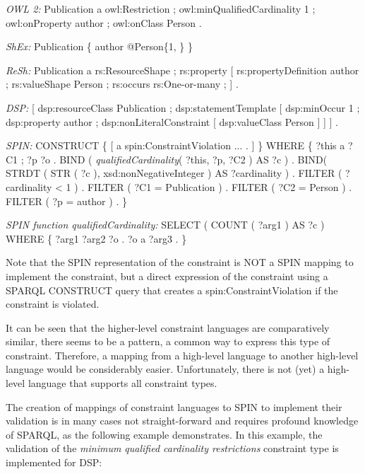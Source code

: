 \documentclass[a4paper,fontsize=11pt]{scrartcl}
\begin{document}
\begin{ex}[commandchars=\\\{\}]
\textit{OWL 2:} Publication a owl:Restriction ;
          owl:minQualifiedCardinality 1 ;
          owl:onProperty author ;
          owl:onClass Person .
		
\textit{ShEx:} Publication \{ author @Person\{1, \} \}

\textit{ReSh:} Publication a rs:ResourceShape ; rs:property [
          rs:propertyDefinition author ;
          rs:valueShape Person ;
          rs:occurs rs:One-or-many ; ] .
		
\textit{DSP:} [ dsp:resourceClass Publication ; dsp:statementTemplate [ 
          dsp:minOccur 1 ; 
          dsp:property author ; 
          dsp:nonLiteralConstraint [ dsp:valueClass Person ] ] ] .
					
\textit{SPIN:} CONSTRUCT \{ [ a spin:ConstraintViolation ... . ] \} WHERE \{ 
          ?this 
              a ?C1 ;
              ?p ?o .
          BIND ( \textit{qualifiedCardinality}( ?this, ?p, ?C2 ) AS ?c ) .
          BIND( STRDT ( STR ( ?c ), xsd:nonNegativeInteger ) AS ?cardinality ) .
          FILTER ( ?cardinality < 1 ) . 
          FILTER ( ?C1 = Publication ) .
          FILTER ( ?C2 = Person ) .
          FILTER ( ?p = author ) . \}
						
\textit{SPIN function qualifiedCardinality:}										
SELECT ( COUNT ( ?arg1 ) AS ?c ) WHERE \{ ?arg1 ?arg2 ?o . ?o a ?arg3 . \}
\end{ex}

Note that the SPIN representation of the constraint is NOT a SPIN mapping to implement the constraint, but a direct expression of the constraint using a SPARQL CONSTRUCT query that creates a spin:ConstraintViolation if the constraint is violated. 

It can be seen that the higher-level constraint languages are comparatively similar, there seems to be a pattern, a common way to express this type of constraint. Therefore, a mapping from a high-level language to another high-level language would be considerably easier. Unfortunately, there is not (yet) a high-level language that supports all constraint types. 

The creation of mappings of constraint languages to SPIN to implement their validation is in many cases not straight-forward and requires profound knowledge of SPARQL, as the following example demonstrates. In this example, the validation of the \emph{minimum qualified cardinality restrictions} constraint type is implemented for DSP:
\end{document}
